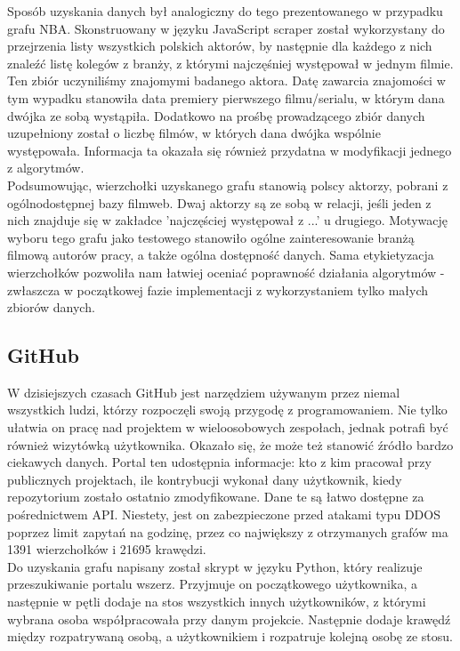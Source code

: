 \documentclass{article}
\begin{document}
Sposób uzyskania danych był analogiczny do tego prezentowanego w przypadku grafu NBA. Skonstruowany w języku JavaScript scraper został wykorzystany do przejrzenia listy wszystkich polskich aktorów, by następnie dla każdego z nich znaleźć listę kolegów z branży, z którymi najczęśniej występował w jednym filmie. Ten zbiór uczyniliśmy znajomymi badanego aktora. Datę zawarcia znajomości w tym wypadku stanowiła data premiery pierwszego filmu/serialu, w którym dana dwójka ze sobą wystąpiła. Dodatkowo na prośbę prowadzącego zbiór danych uzupełniony został o liczbę filmów, w których dana dwójka wspólnie występowała. Informacja ta okazała się również przydatna w modyfikacji jednego z algorytmów.\\

Podsumowując, wierzchołki uzyskanego grafu stanowią polscy aktorzy, pobrani z ogólnodostępnej bazy filmweb. Dwaj aktorzy są ze sobą w relacji, jeśli jeden z nich znajduje się w zakładce 'najczęściej występował z ...' u drugiego. Motywację wyboru tego grafu jako testowego stanowiło ogólne zainteresowanie branżą filmową autorów pracy, a także ogólna dostępność danych. Sama etykietyzacja wierzchołków pozwoliła nam łatwiej oceniać poprawność działania algorytmów - zwłaszcza w początkowej fazie implementacji z wykorzystaniem tylko małych zbiorów danych.

\subsection{GitHub}
W dzisiejszych czasach GitHub jest narzędziem używanym przez niemal
wszystkich ludzi, którzy rozpoczęli swoją przygodę z programowaniem. Nie tylko ułatwia on pracę nad projektem w wieloosobowych zespołach, jednak potrafi być również wizytówką użytkownika. Okazało się, że może też stanowić źródło bardzo ciekawych danych. Portal ten udostępnia informacje: kto z kim pracował przy publicznych projektach, ile kontrybucji wykonał dany użytkownik, kiedy repozytorium zostało ostatnio zmodyfikowane. Dane te są łatwo dostępne za pośrednictwem API. Niestety, jest on zabezpieczone przed atakami typu DDOS poprzez limit zapytań na godzinę, przez co największy z otrzymanych grafów ma 1391 wierzchołków i 21695 krawędzi.\\

Do uzyskania grafu napisany został skrypt w języku Python, który realizuje przeszukiwanie portalu wszerz. Przyjmuje on początkowego użytkownika, a następnie w pętli dodaje na stos wszystkich innych użytkowników, z którymi wybrana osoba współpracowała przy danym projekcie. Następnie dodaje krawędź między rozpatrywaną osobą, a użytkownikiem i rozpatruje kolejną osobę ze stosu.\\
\end{document}
